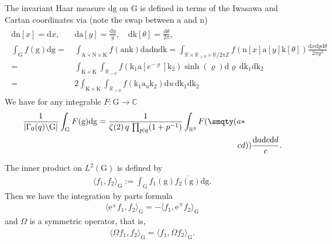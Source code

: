\documentclass[12pt]{amsart}
\theoremstyle{definition}
\theoremstyle{remark}
\numberwithin{equation}{section}
\newcommand{\G}{\mathrm{G}}
\newcommand{\C}{{\mathbb C}}
\newcommand{\R}{{\mathbb R}}
\newcommand{\Z}{{\mathbb Z}}
\newcommand{\1}{{\mathbf 1}}
\renewcommand{\a}{\mathrm{a}}
\newcommand{\n}{\mathrm{n}}
\renewcommand{\k}{\mathrm{k}}
\newcommand{\g}{\mathrm{g}}
\renewcommand{\d}{\mathrm d}
\renewcommand{\n}{\mathrm{n}}
\begin{document}
The invariant Haar measure $\d \g$ on $\G$ is defined in terms of the Iwasawa and Cartan coordinates via (note the swap between $\a$ and $\n$)
\begin{align} \label{eq:integrationonG}
\begin{split}
     \d \mathrm{n}[x] = \d x, \quad & \d \mathrm{a}[y] = \frac{\d y}{y}, \quad \d \mathrm{k}[\theta] = \frac{\d \theta}{2\pi}, \\
   \int_\G  f(\g)\d \g =& \int_{\mathrm{A} \times \mathrm{N} \times \mathrm{K}} f(\a \n \k)  \d \a\d \n \d \k  =    \int_{\R\times \R_{>0} \times \R/2\pi\Z} f(\n[x] \a[y] \k[\theta]) \frac{\d x \d y \d \theta}{2\pi y^2} \\
   =&\int_{\mathrm{K} \times \mathrm{K}} \int_{\R_{>0}} f(\k_1 \a[e^{-\varrho}] \k_2)  \sinh(\varrho) \d \varrho \,\d \k_1 \d \k_2 \\
   =& 2 \int_{\mathrm{K} \times \mathrm{K}} \int_{\R_{>0}} f(\k_1 \a_u \k_2)   \d u \,\d \k_1 \d \k_2 
\end{split}
\end{align}
We have for any integrable $F:\G \to\C$
\begin{align} \label{eq:integralinmatrix}
   \frac{1}{ |\Gamma_0(q)\backslash \G|}    \int_\G  F(\g)\d \g = \frac{1}{  \zeta(2) \, q \, \prod_{p|q}(1+p^{-1})}   \int_{\R^3}  F(\smqty(a & \ast \\ c & d)) \frac{\d a \d c \d d}{c}.
\end{align}

The inner product on $L^2(\G)$ is defined by
\begin{align*}
    \langle f_1,f_2\rangle_\G := \int_\G f_1(\g) \overline{f_2(\g)} \d \g.
\end{align*}
Then we have the integration by parts formula
\begin{align} \label{eq:integrationbypartsraisinglowering}
   \langle 
 \mathrm{e}^{\pm} f_1,f_2\rangle_\G  = -   \langle 
 f_1, \mathrm{e}^{\mp}f_2\rangle_\G
\end{align}
 and $\Omega$ is  a symmetric operator, that is, 
 \begin{align} \label{eq:omegaselfadjoint}
      \langle 
\Omega f_1,f_2\rangle_\G   =   \langle 
 f_1, \Omega f_2\rangle_\G. 
 \end{align}
\end{document}
